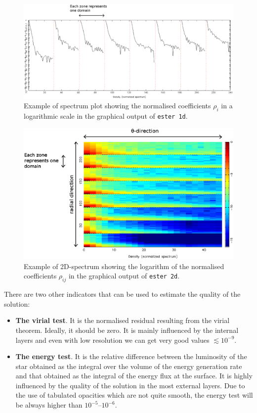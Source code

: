 \begin{figure}[H]
\includegraphics[width=\textwidth]{fig/spectrum1d.eps}
\caption{Example of spectrum plot showing the normalised coefficients $\rho_{i}$ in a logarithmic scale
 in the graphical output of {\tt ester 1d}.
\label{fig:spectrum1d}}
\end{figure} 
\begin{figure}[H]
\includegraphics[width=\textwidth]{fig/spectrum2d.eps}
\caption{Example of 2D-spectrum showing the logarithm of the normalised coefficients $\rho_{ij}$ 
in the graphical output of {\tt ester 2d}.
\label{fig:spectrum2d}}
\end{figure}

There are two other indicators that can be used to estimate the quality
of the solution:

\begin{itemize}
\item {\bf The virial test}. It is the normalised residual resulting from
the virial theorem.  Ideally, it should be zero. It is mainly influenced
by the internal layers and even with low resolution we can get very good
values $\lesssim10^{-9}$.

\item {\bf The energy test}. It is the relative difference between
the luminosity of the star obtained as the integral over the volume
of the energy generation rate and that obtained as the integral of the
energy flux at the surface. It is highly influenced by the quality of
the solution in the most external layers. Due to the use of tabulated
opacities which are not quite smooth, the energy test will be always
higher than $10^{-5}$--$10^{-6}$.

\end{itemize}

